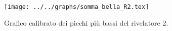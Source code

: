 \begin{figure}[h] \centering\texttt{[image: ../../graphs/somma\_bella\_R2.tex]}\caption{Grafico calibrato dei picchi più bassi del rivelatore 2. }\label{gr:somma_bella_R2} \end{figure}
